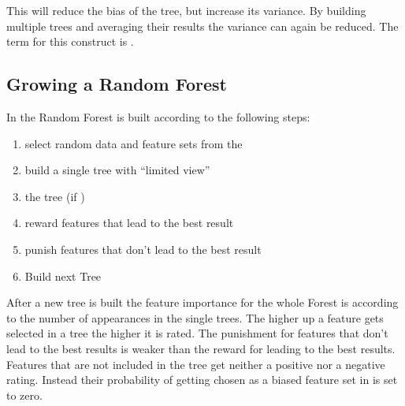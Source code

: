 \documentclass[letterpaper,10pt,english]{sphinxmanual}
\begin{document}
This will reduce the bias of the tree, but increase its variance.
By building multiple trees and averaging their results the variance can again be reduced.
The term for this construct is {\hyperref[\detokenize{Overview:term-random-forest}]{}}.


\subsection{Growing a Random Forest}
\label{\detokenize{RF:growing-a-random-forest}}
In {\hyperref[\detokenize{RF:buildforest}]{}} the Random Forest is built according to the following steps:
\begin{enumerate}
\item {} 
select random data and feature sets from the {\hyperref[\detokenize{Generate_Database:compute}]{}}

\item {} 
build a single tree with ``limited view''

\item {} 
{\hyperref[\detokenize{Overview:term-pruning}]{}} the tree (if {\hyperref[\detokenize{execution:hyperparameters}]{}})

\item {} 
reward features that lead to the best result

\item {} 
punish features that don't lead to the best result

\item {} 
Build next Tree

\end{enumerate}

After a new tree is built the feature importance for the whole Forest is {\hyperref[\detokenize{RF:update-rf}]{}} according to the number of appearances in the single trees.
The higher up a feature gets selected in a tree the higher it is rated. The punishment for features that don't lead to the best results is weaker than the reward for leading to the best results.
Features that are not included in the tree get neither a positive nor a negative rating.
Instead their probability of getting chosen as a biased feature set in {\hyperref[\detokenize{RF:pred-new}]{}} is set to zero.
\end{document}
